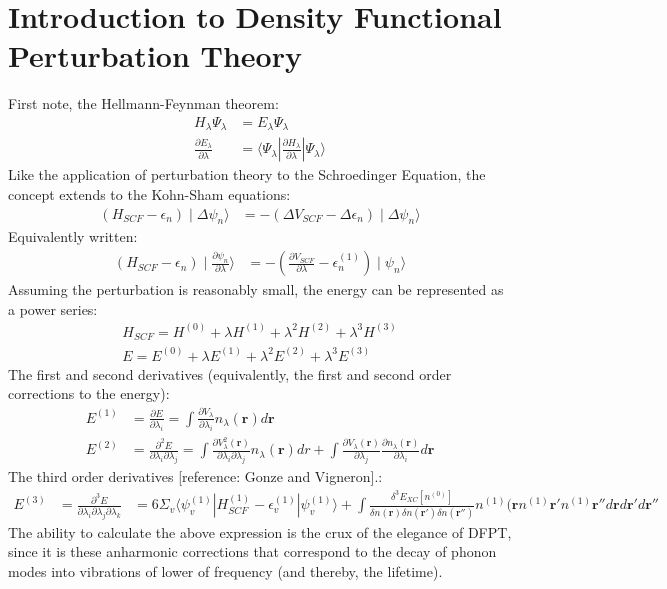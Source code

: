 \documentclass{article}
\numberwithin{equation}{section}
\begin{document}
\section*{Introduction to Density Functional Perturbation Theory}
First note, the Hellmann-Feynman theorem:
\begin{align*}
	H_{\lambda}\Psi_{\lambda}&=E_{\lambda}\Psi_{\lambda}\\
        \frac{\partial E_{\lambda}}{\partial \lambda}&=\langle \Psi_{\lambda}|\frac{\partial H_{\lambda}}{\partial \lambda}|\Psi_{\lambda}\rangle
\end{align*}
Like the application of perturbation theory to the Schroedinger Equation, the concept extends to the Kohn-Sham equations:
\begin{align*}
	(H_{SCF}-\epsilon_n)\mid\Delta\psi_n\rangle&=-(\Delta V_{SCF}-\Delta \epsilon_n)\mid\Delta\psi_n\rangle
\end{align*}
Equivalently written:
\begin{align*}
	(H_{SCF}-\epsilon_n)\mid\frac{\partial \psi_n}{\partial \lambda}\rangle&=-(\frac{\partial V_{SCF}}{\partial \lambda}-\epsilon_n^{(1)})\mid\psi_n\rangle        
\end{align*}
Assuming the perturbation is reasonably small, the energy can be represented as a power series:
\begin{align*}
	H_{SCF}=H^{(0)}+\lambda H^{(1)}+\lambda^2 H^{(2)}+\lambda^3 H^{(3)}\\
        E=E^{(0)}+\lambda E^{(1)}+\lambda^2 E^{(2)}+\lambda^3 E^{(3)}
\end{align*}
The first and second derivatives (equivalently, the first and second order corrections to the energy):
\begin{align*}
E^{(1)}&=\frac{\partial E}{\partial \lambda_i}=\int \frac{\partial V_{\lambda}}{\partial \lambda_i}n_{\lambda}(\mathbf{r})d\mathbf{r}\\
E^{(2)}&=\frac{\partial^2 E}{\partial \lambda_i\partial \lambda_j}=\int \frac{\partial V^2_{\lambda}(\mathbf{r})}{\partial \lambda_i\partial \lambda_j}n_{\lambda}(\mathbf{r})dr+\int\frac{\partial V_{\lambda}(\mathbf{r})}{\partial \lambda_j}\frac{\partial n_{\lambda}(\mathbf{r})}{\partial \lambda_i}d\mathbf{r}
\end{align*}
The third order derivatives [reference: Gonze and Vigneron].:
\begin{align*}
E^{(3)}&=\frac{\partial^3 E}{\partial \lambda_i\partial \lambda_j\partial \lambda_k}&=6 \Sigma_v\langle\psi_v^{(1)}|H^{(1)}_{SCF}-\epsilon_v^{(1)}|\psi_v^{(1)}\rangle +\int \frac{\delta^3E_{XC}[n^{(0)}]}{\delta n(\mathbf{r}) \delta n(\mathbf{r'}) \delta n(\mathbf{r''})}n^{(1)}(\mathbf{r}n^{(1)}\mathbf{r'} n^{(1)}\mathbf{r''} d\mathbf{r}d\mathbf{r'}d\mathbf{r''}
\end{align*}
The ability to calculate the above expression is the crux of the elegance of DFPT, since it is these anharmonic corrections that correspond to the decay of phonon modes into vibrations of lower of frequency (and thereby, the lifetime).
\end{document}
